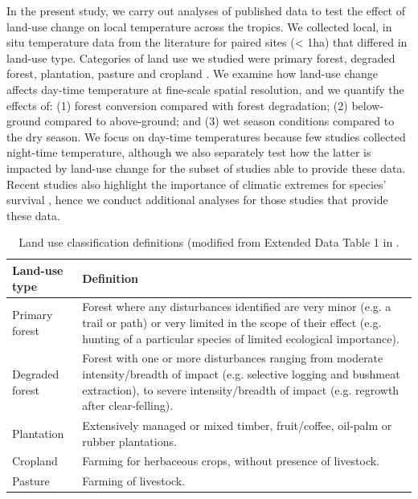 \documentclass[12pt,a4paper,]{report}
\theoremstyle{definition}
\theoremstyle{definition}
\theoremstyle{definition}
\theoremstyle{remark}
\begin{document}
In the present study, we carry out analyses of published data to test
the effect of land-use change on local temperature across the tropics.
We collected local, in situ temperature data from the literature for
paired sites (\textless{} 1ha) that differed in land-use type.
Categories of land use we studied were primary forest, degraded forest,
plantation, pasture and cropland \citep[\autoref{tab:tab-2-1}; modified
from Extended Data Table 1 in][]{newbold_global2015}. We examine how
land-use change affects day-time temperature at fine-scale spatial
resolution, and we quantify the effects of: (1) forest conversion
compared with forest degradation; (2) below-ground compared to
above-ground; and (3) wet season conditions compared to the dry season.
We focus on day-time temperatures because few studies collected
night-time temperature, although we also separately test how the latter
is impacted by land-use change for the subset of studies able to provide
these data. Recent studies also highlight the importance of climatic
extremes for species' survival
\citep[e.g.][]{deutsch_impacts2008, christidis_role2013}, hence we
conduct additional analyses for those studies that provide these data.

\begin{table}
\begin{center}
\renewcommand{\arraystretch}{1} %
\setlength{\tabcolsep}{5pt} %
    \begin{tabular}{ lp{11cm}}
    \toprule 
    \bfseries Land-use type & \bfseries Definition \\ \midrule
    Primary forest  & Forest where any disturbances identified are very minor (e.g. a trail or path)
                      or very limited in the scope of their effect (e.g. hunting of a particular
                      species of limited ecological importance).\\
    Degraded forest & Forest with one or more disturbances ranging from moderate intensity/breadth
                      of impact (e.g. selective logging and bushmeat extraction), to severe
                      intensity/breadth of impact (e.g. regrowth after clear-felling).\\
    Plantation      & Extensively managed or mixed timber, fruit/coffee, oil-palm or rubber
                      plantations.\\
    Cropland        & Farming for herbaceous crops, without presence of livestock. \\
    Pasture         & Farming of livestock.\\
    \bottomrule
    \end{tabular}
\end{center}
\caption{\label{tab:tab-2-1}Land use classification definitions (modified from Extended Data Table 1 in \citet{newbold_global2015}.}
\end{table}
\end{document}
